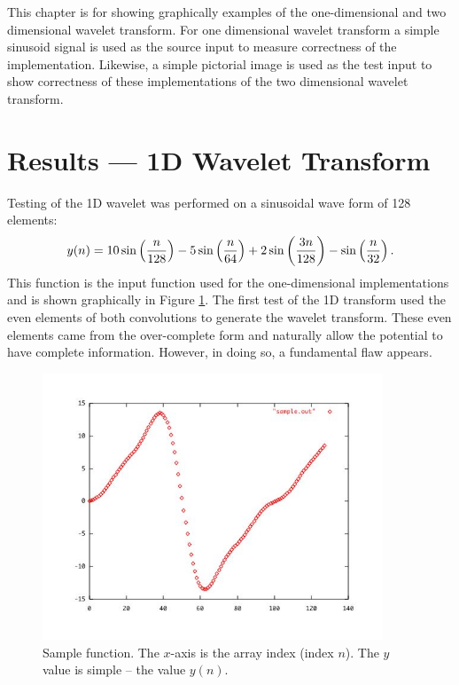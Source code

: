 This chapter is for showing graphically examples of the one-dimensional and two dimensional wavelet transform.  For one dimensional wavelet transform a simple sinusoid signal is used as the source input to measure correctness of the implementation.   Likewise, a simple pictorial image is used as the test input to show correctness of these implementations of the two dimensional wavelet transform.  

\section{Results --- 1D Wavelet Transform}

Testing of the 1D wavelet was performed on a sinusoidal wave form of 128 elements:
\begin{equation}\label{sinusoid}
y(n) = 10 \sin \left({n \over 128}\right) 
	- 5 \sin \left({n \over 64}\right) 
	+ 2 \sin \left({3 n \over 128}\right)
	- \sin \left({n \over 32}\right).
\end{equation}
This function  is the input function used for the one-dimensional implementations and is shown graphically in Figure \ref{sample}. The first test of the 1D transform used the even elements of both convolutions to generate the wavelet transform.  These even elements came from the over-complete form and naturally allow the potential to have complete information.  However, in doing so, a fundamental flaw appears.

\begin{figure}
\begin{center}\includegraphics [width=4in]{sample.jpg} \end{center}
\caption{Sample function.  The $x$-axis is the array index (index $n$).  The $y$ value is simple -- the value $y(n)$. }
\label{sample}
\end{figure}

